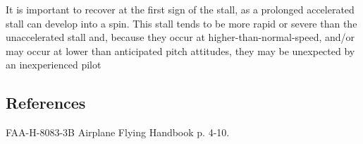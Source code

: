 It is important to recover at the first sign of the stall, as a prolonged
accelerated stall can develop into a spin. This stall tends to be more rapid or
severe than the unaccelerated stall and, because they occur at
higher-than-normal-speed, and/or may occur at lower than anticipated pitch
attitudes, they may be unexpected by an inexperienced pilot

\subsection{References}

FAA-H-8083-3B Airplane Flying Handbook p. 4-10.
